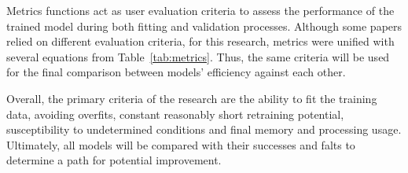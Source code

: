 %
Metrics functions act as user evaluation criteria to assess the performance of the trained model during both fitting and validation processes.
Although some papers relied on different evaluation criteria, for this research, metrics were unified with several equations from \mbox{Table~\ref{tab:metrics}}.
Thus, the same criteria will be used for the final comparison between models' efficiency against each other.
\begin{table}[htbp]
    \renewcommand{\arraystretch}{1.3}
    \caption{Model's metrics functions}
    \centering
    \label{tab:metrics}
\end{table}

%
Overall, the primary criteria of the research are the ability to fit the training data, avoiding overfits, constant reasonably short retraining potential, susceptibility to undetermined conditions and final memory and processing usage.
Ultimately, all models will be compared with their successes and falts to determine a path for potential improvement.
